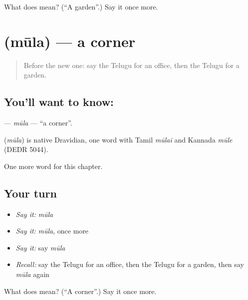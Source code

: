 \begin{tcolorbox}[breakable,colback=teal!4,colframe=teal!35!black,title={Before you move on}]
What does  mean? (\textquotedblleft{}A garden\textquotedblright{}.) Say it once more.
\end{tcolorbox}
\section[\texorpdfstring{\te{మూల} (mūla)}{మూల (mūla)}]{ (mūla) — a corner}

\label{lesson:TE-C104-mula}



\begin{quote}
Before the new one: say the Telugu for an office, then the Telugu for a garden.
\end{quote}

\subsection*{You'll want to know: }
\textbf{} — \emph{mūla} — \textquotedblleft{}a corner\textquotedblright{}.

\begin{cousinweb}
\textbf{} (\emph{mūla}) is native Dravidian, one word with Tamil \emph{mūlai} and Kannada \emph{mūle} (DEDR 5044).
\end{cousinweb}

\begin{grammarlens}[title={What you've built}]
One more word for this chapter.
\end{grammarlens}

\subsection*{Your turn}
\begin{itemize}
\raggedright
  \item \emph{Say it:} \emph{mūla}
  \item \emph{Say it:} \emph{mūla}, once more
  \item \emph{Say it:} say \emph{mūla}
  \item \emph{Recall:} say the Telugu for an office, then the Telugu for a garden, then say \emph{mūla} again
\end{itemize}

\begin{tcolorbox}[breakable,colback=teal!4,colframe=teal!35!black,title={Before you move on}]
What does  mean? (\textquotedblleft{}A corner\textquotedblright{}.) Say it once more.
\end{tcolorbox}

